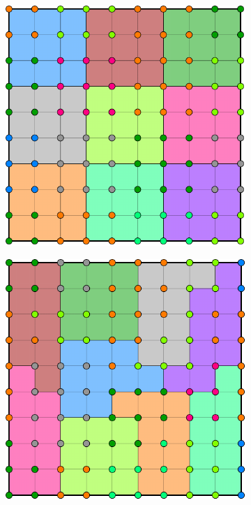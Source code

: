 \begin{figure}[htbp]
  \begin{subfigure}[t]{0.3\textwidth}
    \centerline{\includegraphics[width=0.9\linewidth]{figs/square/square_cart_struct_node_part}}
  \end{subfigure}
  \hfill
  \begin{subfigure}[t]{0.3\textwidth}
    \centerline{\includegraphics[width=0.9\linewidth]{figs/square/square_cart_metis_node_part}}

\end{subfigure}
\end{figure}
